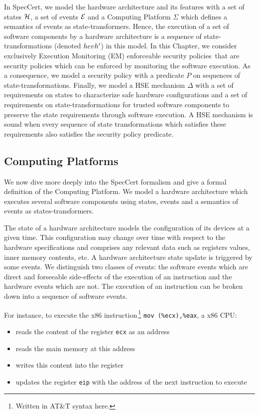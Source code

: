 In SpecCert, we model the hardware architecture and its features with a set of
states $\mathcal{H}$, a set of events $\mathcal{E}$ and a Computing Platform $\Sigma$
which defines a semantics of events as state-transformers. Hence, the execution
of a set of software components by a hardware architecture is a sequence of
state-transformations (denoted $\transitionLTS{Ez}{h}{ev}{h'}$) in this model.
In this Chapter, we consider exclusively Execution Monitoring (EM) enforceable
security policies\,\cite{schneider2000enforceable,basin2013enforceable} that are
security policies which can be enforced by monitoring the software execution. As
a consequence, we model a security policy with a predicate $P$ on sequences of
state-transformations.  Finally, we model a HSE mechanism $\Delta$ with a set of
requirements on states to characterize safe hardware configurations and a set of
requirements on state-transformations for trusted software components to
preserve the state requirements through software execution. A HSE mechanism is
sound when every sequence of state transformations which satisfies these
requirements also satisfies the security policy predicate.

\subsection{Computing Platforms} \label{subsec:speccert:computing}

We now dive more deeply into the SpecCert formalism and give a formal definition
of the Computing Platform. We model a hardware architecture which executes
several software components using states, events and a semantics of events as
states-transformers.

The state of a hardware architecture models the configuration of its devices at
a given time. This configuration may change over time with respect to the
hardware specifications and comprises any relevant data such as registers
values, inner memory contents, etc. A hardware architecture state update is
triggered by some events. We distinguish two classes of events: the software
events which are direct and forseeable side-effects of the execution of an
instruction and the hardware events which are not. The execution of an
instruction can be broken down into a sequence of software events.

For instance, to execute the x86 instruction\,\footnote{Written in AT\&T syntax
  here.} \texttt{mov (\%ecx),\%eax}, a x86 CPU:
\begin{itemize}
\item reads the content of the register \texttt{ecx} as an address
\item reads the main memory at this address
\item writes this content into the register 
\item updates the register \texttt{eip} with the address of the next instruction
  to execute
\end{itemize}


